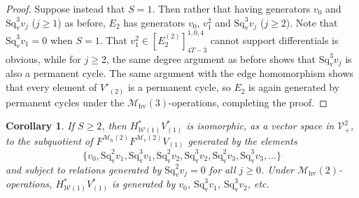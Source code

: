 \documentclass[11pt]{amsart} \renewcommand{\baselinestretch}{1.2}
\theoremstyle{plain}
\newtheorem{cor}[thm]{Corollary}
\numberwithin{equation}{section} %
\theoremstyle{plain}
\newtheorem{cor}[thm]{Corollary}
\numberwithin{equation}{chapter} %
\newcommand{\calW}{\mathcal{W}}
\newcommand{\calV}{\mathcal{V}}
\newcommand{\calw}{\mathcal{W}}
\newcommand{\calmv}{\mathcal{M}\dver}
\newcommand{\calmh}{\mathcal{M}\dhor}
\newcommand{\calMv}{\mathcal{M}\dver}
\newcommand{\calMh}{\mathcal{M}\dhor}
\newcommand{\calMhv}{\mathcal{M}_\mathrm{hv}}
\newcommand{\vect}[2]{\calV^{#1}_{#2}}
\newcommand{\F}{\mathbb{F}}
\newcommand{\Ftwo}{\F_2}
\newcommand{\E}[5]{[E^{#1}_{#2}#3]^{#4}_{#5}}
\newcommand{\dver}{_\mathrm{v}}
\newcommand{\dhor}{_\mathrm{h}}
\newcommand{\Sqv}{\mathrm{Sq}\dver}
\begin{document}
\begin{Calculations of HWn}
\begin{proof}
Suppose instead that $S=1$. Then rather that having generators $v_0$ and $\Sqv^3v_j$ ($j\geq1$) as before, $E_2$ has generators $v_0$, $v_1^{2}$ and $\Sqv^3v_j$ ($j\geq2$). Note that $\Sqv^{3}v_1=0$ when $S=1$.
That $v_1^2\in\E{(2)}{2}{}{1,0,4}{4T-3}$ cannot support differentials is obvious, while for $j\geq2$, the same degree argument as before shows that $\Sqv^3v_j$ is also a permanent cycle. The same argument with the edge homomorphism shows that every element of $V'_{(2)}$ is a permanent cycle, so $E_2$ is again generated by permanent cycles under the $\calMhv(3)$-operations, completing the proof.
\end{proof}
\begin{cor}
\label{the actual statement of what H1V1 is}
If $S\geq2$, then $H^*_{\calW(1)}V^*_{(1)}$ is isomorphic, as a vector space in $\vect{2}{+}$, to the subquotient of $F^{\calMh(2)}F^{\calMv(2)}V_{(1)}$ generated by the elements
\[\{v_0,\Sqv^2v_{1},\Sqv^3v_{1},\Sqv^2v_{2},\Sqv^3v_{2},\Sqv^2v_{3},\Sqv^3v_{3},\ldots\}\]
and subject to relations generated by $\Sqv^2 v_{j}=0$ for all $j\geq0$. Under $\calMhv(2)$-operations, $H^*_{\calw(1)}V^*_{(1)}$ is generated by $v_0$, $\Sqv^3 v_1$, $\Sqv^3 v_2$, etc.


\end{cor}
\end{Calculations of HWn}
\end{document}

